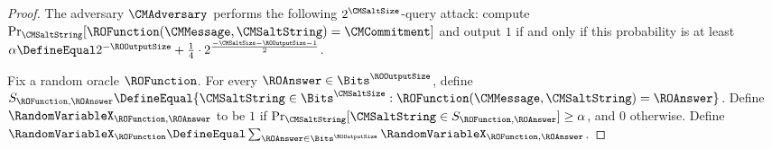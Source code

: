 \begin{proof}
The adversary $\CMAdversary$ performs the following $2^{\CMSaltSize}$-query attack: compute $\Pr_{\CMSaltString}[\ROFunction(\CMMessage,\CMSaltString) = \CMCommitment]$ and output $1$ if and only if this probability is at least $\alpha \DefineEqual 2^{-\ROOutputSize} + \frac{1}{4} \cdot 2^{\frac{-\CMSaltSize - \ROOutputSize-1}{2}}$.

Fix a random oracle $\ROFunction$. For every $\ROAnswer \in \Bits^{\ROOutputSize}$, define $S_{\ROFunction,\ROAnswer} \DefineEqual \{ \CMSaltString \in \Bits^{\CMSaltSize} : \ROFunction(\CMMessage,\CMSaltString) = \ROAnswer \}$. Define $\RandomVariableX_{\ROFunction,\ROAnswer}$ to be $1$ if $\Pr_{\CMSaltString}[\CMSaltString \in S_{\ROFunction,\ROAnswer}] \geq \alpha$, and $0$ otherwise. Define $\RandomVariableX_{\ROFunction} \DefineEqual \sum_{\ROAnswer \in \Bits^{\ROOutputSize}}\RandomVariableX_{\ROFunction,\ROAnswer}$.


\end{proof}
